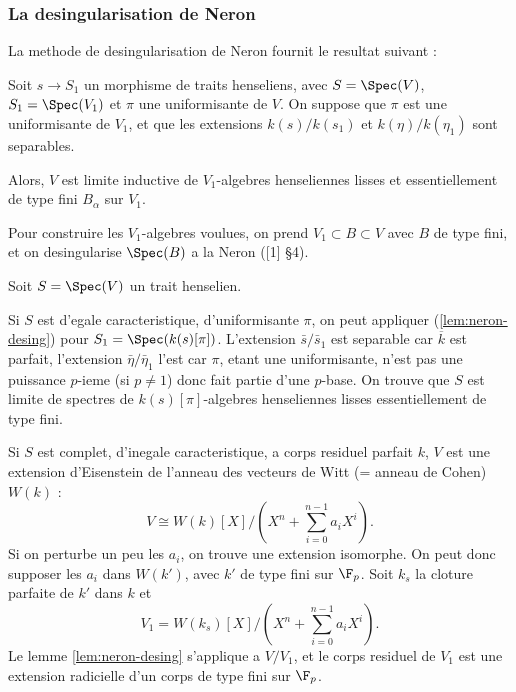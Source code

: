 \subsubsection{La desingularisation de Neron}
\label{subsubsec:neron}

La methode de desingularisation de Neron fournit le resultat suivant :

\begin{lemma}
\label{lem:neron-desing}
Soit $s \to S_1$ un morphisme de traits henseliens, avec $S = \Spec(V)$, $S_1 = \Spec(V_1)$ et $\pi$ une uniformisante de $V$. On suppose que $\pi$ est une uniformisante de $V_1$, et que les extensions $k(s)/k(s_1)$ et $k(\eta)/k(\eta_1)$ sont separables.

Alors, $V$ est limite inductive de $V_1$-algebres henseliennes lisses et essentiellement de type fini $B_\alpha$ sur $V_1$.
\end{lemma}

Pour construire les $V_1$-algebres voulues, on prend $V_1 \subset B \subset V$ avec $B$ de type fini, et on desingularise $\Spec(B)$ a la Neron ([1] \S 4).

Soit $S = \Spec(V)$ un trait henselien.

\begin{proposition}
\label{prop:egal-car}
Si $S$ est d'egale caracteristique, d'uniformisante $\pi$, on peut appliquer (\ref{lem:neron-desing}) pour $S_1 = \Spec(k(s)[\pi])$. L'extension $\bar{s}/\bar{s}_1$ est separable car $\overline{k}$ est parfait, l'extension $\bar{\eta}/\bar{\eta}_1$ l'est car $\pi$, etant une uniformisante, n'est pas une puissance $p$-ieme (si $p \neq 1$) donc fait partie d'une $p$-base. On trouve que $S$ est limite de spectres de $k(s)[\pi]$-algebres henseliennes lisses essentiellement de type fini.
\end{proposition}

\begin{proposition}
\label{prop:inegale-car}
Si $S$ est complet, d'inegale caracteristique, a corps residuel parfait $k$, $V$ est une extension d'Eisenstein de l'anneau des vecteurs de Witt (= anneau de Cohen) $W(k)$ :
\[
V \cong W(k)[X]/(X^n + \sum_{i=0}^{n-1} a_i X^i) .
\]
Si on perturbe un peu les $a_i$, on trouve une extension isomorphe. On peut donc supposer les $a_i$ dans $W(k')$, avec $k'$ de type fini sur $\F_p$. Soit $k_s$ la cloture parfaite de $k'$ dans $k$ et
\[
V_1 = W(k_s)[X]/(X^n + \sum_{i=0}^{n-1} a_i X^i) .
\]
Le lemme \ref{lem:neron-desing} s'applique a $V/V_1$, et le corps residuel de $V_1$ est une extension radicielle d'un corps de type fini sur $\F_p$.
\end{proposition}


